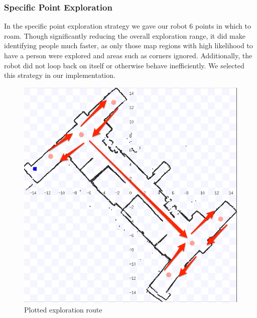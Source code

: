 \documentclass{article}
\begin{document}
  
	\begin{minipage}{\linewidth}
      \centering
      \begin{minipage}[b]{0.45\linewidth}
      \subsubsection{Specific Point Exploration}
   In the specific point exploration strategy we gave our robot 6 points in which to roam. Though significantly reducing the overall exploration range, it did make identifying people much faster, as only those map regions with high likelihood to have a person were explored and areas such as corners ignored. Additionally, the robot did not loop back on itself or otherwise behave inefficiently. We selected this strategy in our implementation.

      \end{minipage}
      \hspace{0.05\linewidth}
      \begin{minipage}{0.45\linewidth}
          \begin{figure}[H]
              \includegraphics[width=\linewidth]{ExperimentalResults10}
              \caption{Plotted exploration route}
          \end{figure}
      \end{minipage}
  \end{minipage}
	
\end{document}
